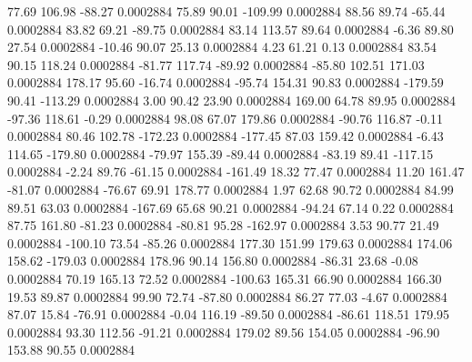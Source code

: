        77.69      106.98      -88.27     0.0002884
       75.89       90.01     -109.99     0.0002884
       88.56       89.74      -65.44     0.0002884
       83.82       69.21      -89.75     0.0002884
       83.14      113.57       89.64     0.0002884
       -6.36       89.80       27.54     0.0002884
      -10.46       90.07       25.13     0.0002884
        4.23       61.21        0.13     0.0002884
       83.54       90.15      118.24     0.0002884
      -81.77      117.74      -89.92     0.0002884
      -85.80      102.51      171.03     0.0002884
      178.17       95.60      -16.74     0.0002884
      -95.74      154.31       90.83     0.0002884
     -179.59       90.41     -113.29     0.0002884
        3.00       90.42       23.90     0.0002884
      169.00       64.78       89.95     0.0002884
      -97.36      118.61       -0.29     0.0002884
       98.08       67.07      179.86     0.0002884
      -90.76      116.87       -0.11     0.0002884
       80.46      102.78     -172.23     0.0002884
     -177.45       87.03      159.42     0.0002884
       -6.43      114.65     -179.80     0.0002884
      -79.97      155.39      -89.44     0.0002884
      -83.19       89.41     -117.15     0.0002884
       -2.24       89.76      -61.15     0.0002884
     -161.49       18.32       77.47     0.0002884
       11.20      161.47      -81.07     0.0002884
      -76.67       69.91      178.77     0.0002884
        1.97       62.68       90.72     0.0002884
       84.99       89.51       63.03     0.0002884
     -167.69       65.68       90.21     0.0002884
      -94.24       67.14        0.22     0.0002884
       87.75      161.80      -81.23     0.0002884
      -80.81       95.28     -162.97     0.0002884
        3.53       90.77       21.49     0.0002884
     -100.10       73.54      -85.26     0.0002884
      177.30      151.99      179.63     0.0002884
      174.06      158.62     -179.03     0.0002884
      178.96       90.14      156.80     0.0002884
      -86.31       23.68       -0.08     0.0002884
       70.19      165.13       72.52     0.0002884
     -100.63      165.31       66.90     0.0002884
      166.30       19.53       89.87     0.0002884
       99.90       72.74      -87.80     0.0002884
       86.27       77.03       -4.67     0.0002884
       87.07       15.84      -76.91     0.0002884
       -0.04      116.19      -89.50     0.0002884
      -86.61      118.51      179.95     0.0002884
       93.30      112.56      -91.21     0.0002884
      179.02       89.56      154.05     0.0002884
      -96.90      153.88       90.55     0.0002884
